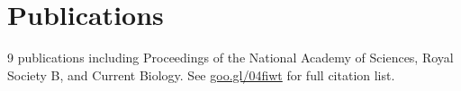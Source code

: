 \documentclass[]{Finlay_Maguire_CV}
\begin{document}
\begin{minipage}[t]{0.66\textwidth}
\sectionsep

\vspace{-0.3cm}
\section{Publications} 
%
%
9 publications including Proceedings of the National Academy of Sciences, Royal Society B, and Current Biology.
See \url{goo.gl/04fiwt} for full citation list.

\end{minipage}
\end{document}
